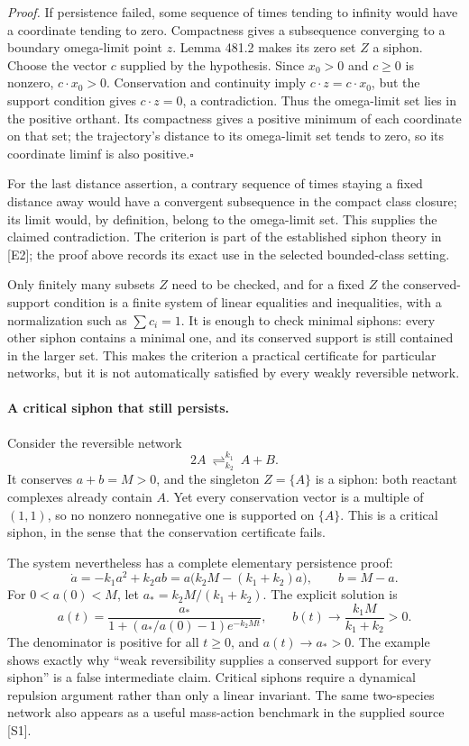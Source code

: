 \documentclass[11pt]{article}
\begin{document}
\emph{Proof.}
If persistence failed, some sequence of times tending to infinity would
have a coordinate tending to zero. Compactness gives a subsequence
converging to a boundary omega-limit point $z$. Lemma 481.2 makes its
zero set $Z$ a siphon. Choose the vector $c$ supplied by the hypothesis.
Since $x_0>0$ and $c\geq0$ is nonzero,
$c\cdot x_0>0$. Conservation and continuity imply
$c\cdot z=c\cdot x_0$, but the support condition gives $c\cdot z=0$,
a contradiction. Thus the omega-limit set lies in the positive orthant.
Its compactness gives a positive minimum of each coordinate on that
set; the trajectory's distance to its omega-limit set tends to zero,
so its coordinate liminf is also positive.\hfill$\square$

For the last distance assertion, a contrary sequence of times staying a
fixed distance away would have a convergent subsequence in the compact
class closure; its limit would, by definition, belong to the omega-limit
set. This supplies the claimed contradiction. The criterion is part of
the established siphon theory in [E2]; the proof above records its exact
use in the selected bounded-class setting.

Only finitely many subsets $Z$ need to be checked, and for a fixed $Z$
the conserved-support condition is a finite system of linear equalities
and inequalities, with a normalization such as $\sum c_i=1$.
It is enough to check minimal siphons: every other siphon contains a
minimal one, and its conserved support is still contained in the larger
set. This makes the criterion a practical certificate for particular
networks, but it is not automatically satisfied by every weakly
reversible network.

\paragraph{A critical siphon that still persists.}
Consider the reversible network
\[
 2A\ \mathop{\rightleftharpoons}^{k_1}_{k_2}\ A+B.
\]
It conserves $a+b=M>0$, and the singleton $Z=\{A\}$ is a siphon:
both reactant complexes already contain $A$. Yet every conservation
vector is a multiple of $(1,1)$, so no nonzero nonnegative one is
supported on $\{A\}$. This is a critical siphon, in the sense that
the conservation certificate fails.

The system nevertheless has a complete elementary persistence proof:
\[
 \dot a=-k_1a^2+k_2ab
        =a\bigl(k_2M-(k_1+k_2)a\bigr),\qquad b=M-a.
\]
For $0<a(0)<M$, let $a_*=k_2M/(k_1+k_2)$. The explicit solution is
\[
 a(t)=\frac{a_*}{1+(a_*/a(0)-1)e^{-k_2Mt}},
 \qquad
 b(t)\longrightarrow\frac{k_1M}{k_1+k_2}>0.
\]
The denominator is positive for all $t\geq0$, and $a(t)\to a_*>0$.
The example shows exactly why ``weak reversibility supplies a conserved
support for every siphon'' is a false intermediate claim. Critical
siphons require a dynamical repulsion argument rather than only a linear
invariant. The same two-species network also appears as a useful
mass-action benchmark in the supplied source [S1].
\end{document}
